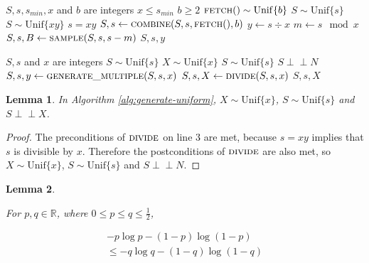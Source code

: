 \documentclass[lettersize,journal]{IEEEtran}
\newtheorem{lemma}{Lemma}
\newcommand{\indep}{\perp\!\!\!\perp}
\newcommand{\unif}[1]{\mathrm{Unif}\{#1\}}
\begin{document}
\begin{algorithm}
\caption{Generating a uniform multiple}
\label{alg:generate-multiple}
\begin{algorithmic}[1]
\Require $S, s, s_{min}, x$ and $b$ are integers
\Require $x \le s_{min}$
\Require $b \ge 2$
\Require $\textsc{fetch}() \sim \unif{b}$
\Require $S \sim \unif{s}$
\Ensure $S \sim \unif{xy}$
\Ensure $s = xy$
        \State $S, s \gets \textsc{combine}(S, s, \textsc{fetch}(), b)$
    \EndWhile
    \State $y \gets s \div x$
    \State $m \gets s \mod x$
    \State $S, s, B \gets \textsc{sample}(S, s, s-m)$ 
        \State \Return $S, s, y$
    \EndIf
  \EndWhile
\EndProcedure
\end{algorithmic}
\end{algorithm}

\begin{algorithm}
\caption{Generating a uniform variable of a given size}
\label{alg:generate-uniform}
\begin{algorithmic}[1]
\Require $S, s$ and $x$ are integers
\Require $S \sim \unif{s}$
\Ensure $X \sim \unif{x}$
\Ensure $S \sim \unif{s}$
\Ensure $S \indep N$
  \State $S, s, y \gets \textsc{generate\_multiple}(S, s, x)$
  \State $S, s, X \gets \textsc{divide}(S, s, x)$
  \State \Return $S, s, X$
\EndProcedure
\end{algorithmic}
\end{algorithm}

\begin{lemma}
    In Algorithm \ref{alg:generate-uniform}, $X \sim \unif{x}$, $S \sim \unif{s}$ and $S \indep X$.
\end{lemma}

\begin{proof}
    The preconditions of $\textsc{divide}$ on line 3 are met, because $s=xy$ implies that $s$ is divisible by $x$. Therefore the postconditions of $\textsc{divide}$ are also met, so $X \sim \unif{x}$, $S \sim \unif{s}$ and $S \indep N$.
\end{proof}

\begin{lemma}
    \label{lem:shannon-inequality}

For $p,q \in \mathbb{R}$, where $0 \le p\le q \le \frac{1}{2}$, 

\begin{align}
-p\log p - (1-p)\log(1-p) \\ \le
-q\log q - (1-q)\log(1-q)
\end{align}
\end{lemma}
\end{document}
